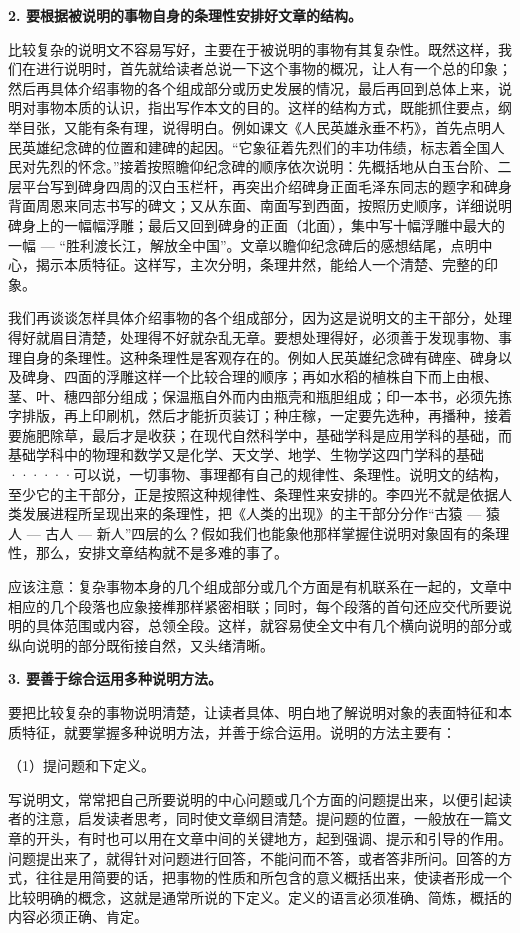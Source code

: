 \textbf{2. 要根据被说明的事物自身的条理性安排好文章的结构。}

比较复杂的说明文不容易写好，主要在于被说明的事物有其复杂性。既然这样，我们在进行说明时，首先就给读者总说一下这个事物的概况，让人有一个总的印象；然后再具体介绍事物的各个组成部分或历史发展的情况，最后再回到总体上来，说明对事物本质的认识，指出写作本文的目的。这样的结构方式，既能抓住要点，纲举目张，又能有条有理，说得明白。例如课文《人民英雄永垂不朽》，首先点明人民英雄纪念碑的位置和建碑的起因。“它象征着先烈们的丰功伟绩，标志着全国人民对先烈的怀念。”接着按照瞻仰纪念碑的顺序依次说明：先概括地从白玉台阶、二层平台写到碑身四周的汉白玉栏杆，再突出介绍碑身正面毛泽东同志的题字和碑身背面周恩来同志书写的碑文；又从东面、南面写到西面，按照历史顺序，详细说明碑身上的一幅幅浮雕；最后又回到碑身的正面（北面），集中写十幅浮雕中最大的一幅 --- “胜利渡长江，解放全中国”。文章以瞻仰纪念碑后的感想结尾，点明中心，揭示本质特征。这样写，主次分明，条理井然，能给人一个清楚、完整的印象。

我们再谈谈怎样具体介绍事物的各个组成部分，因为这是说明文的主干部分，处理得好就眉目清楚，处理得不好就杂乱无章。要想处理得好，必须善于发现事物、事理自身的条理性。这种条理性是客观存在的。例如人民英雄纪念碑有碑座、碑身以及碑身、四面的浮雕这样一个比较合理的顺序；再如水稻的植株自下而上由根、茎、叶、穗四部分组成；保温瓶自外而内由瓶壳和瓶胆组成；印一本书，必须先拣字排版，再上印刷机，然后才能折页装订；种庄稼，一定要先选种，再播种，接着要施肥除草，最后才是收获；在现代自然科学中，基础学科是应用学科的基础，而基础学科中的物理和数学又是化学、天文学、地学、生物学这四门学科的基础······可以说，一切事物、事理都有自己的规律性、条理性。说明文的结构，至少它的主干部分，正是按照这种规律性、条理性来安排的。李四光不就是依据人类发展进程所呈现出来的条理性，把《人类的出现》的主干部分分作“古猿 --- 猿人 --- 古人 --- 新人”四层的么？假如我们也能象他那样掌握住说明对象固有的条理性，那么，安排文章结构就不是多难的事了。

应该注意：复杂事物本身的几个组成部分或几个方面是有机联系在一起的，文章中相应的几个段落也应象接榫那样紧密相联；同时，每个段落的首句还应交代所要说明的具体范围或内容，总领全段。这样，就容易使全文中有几个横向说明的部分或纵向说明的部分既衔接自然，又头绪清晰。

\textbf{3. 要善于综合运用多种说明方法。}

要把比较复杂的事物说明清楚，让读者具体、明白地了解说明对象的表面特征和本质特征，就要掌握多种说明方法，并善于综合运用。说明的方法主要有：

（1）提问题和下定义。

写说明文，常常把自己所要说明的中心问题或几个方面的问题提出来，以便引起读者的注意，启发读者思考，同时使文章纲目清楚。提问题的位置，一般放在一篇文章的开头，有时也可以用在文章中间的关键地方，起到强调、提示和引导的作用。问题提出来了，就得针对问题进行回答，不能问而不答，或者答非所问。回答的方式，往往是用简要的话，把事物的性质和所包含的意义概括出来，使读者形成一个比较明确的概念，这就是通常所说的下定义。定义的语言必须准确、简炼，概括的内容必须正确、肯定。

